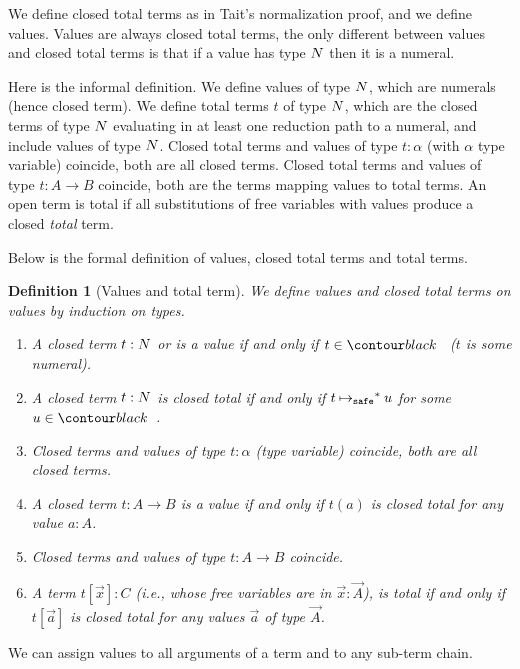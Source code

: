 \documentclass{article}
\newtheorem{definition}[theorem]{Definition}
\begin{document}
We define closed total terms as in Tait's normalization proof, and we define values.
Values are always closed total terms,
the only different between values and closed total terms 
is that if a value has type ${N}$ then it is a numeral.

Here is the informal definition. We define values of type ${N}$, which are numerals (hence closed term). 
We define total terms $t$ of type ${N}$, which are
the closed terms of type ${N}$ evaluating in at least one reduction path to a numeral, and
include values of type ${N}$. 
Closed total terms and values of type $t:\alpha$ (with $\alpha$ type variable) coincide, 
both are all closed terms.
Closed total terms and values of type $t:A \rightarrow B$ coincide, 
both are the terms mapping values to total terms. 
An open term is total if all substitutions of free variables with values produce a closed \emph{total} term.

Below is the formal definition of values, closed total terms and total terms.

\begin{definition}[Values and total term]
  We define values and closed total terms on values by induction on types. 
  \begin{enumerate}
  \item
    A closed term $t:{N}$ or is a \emph{value} if and only if $t \in \Nat$ ($t$ is some numeral).
  \item
    A closed term $t:{N}$ is \emph{closed total}
    if and only if $t \mathbin{{\mapsto}_{\tiny \tt safe}}^* u$ for some $u\in \Nat$.
  \item
    Closed terms and values of type $t:\alpha$ (type variable) coincide, both are all closed terms.
   \item
    A closed term $t:A\rightarrow B$ is a \emph{value}
    if and only if $t(a)$ is closed total for any value $a:A$.
   \item
    Closed terms and values of type  $t:A\rightarrow B$ coincide.
  \item
    A term $t[\vec{x}]:C$ (i.e., whose free variables are in $\vec{x}:\vec{A}$), is
    \emph{total} if and only if $t[\vec{a}]$ is closed total for any values $\vec{a}$ of type $\vec{A}$.
  \end{enumerate}
\end{definition}

We can assign values to all arguments of a term and to any sub-term chain.
\end{document}
